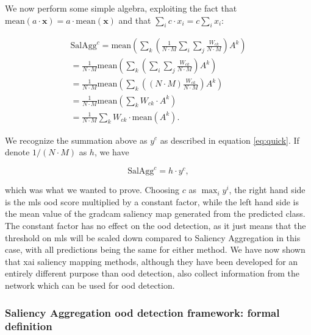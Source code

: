 \documentclass[UKenglish]{uiomasterthesis} %
\theoremstyle{definition}
\begin{document}
We now perform some simple algebra, exploiting the fact that $\text{mean}(a \cdot \bm{x}) = a \cdot \text{mean}(\bm{x})$ and that $\sum_i c \cdot x_i = c \sum_i x_i$:

\begin{gather}
    \text{SalAgg}^c = \text{mean} \left(\sum_k \left( \frac{1}{N \cdot M} \sum_i \sum_j \frac{W_{ck}}{N \cdot M} \right) A^k \right) \\
    = \frac{1}{N \cdot M} \text{mean} \left(\sum_k \left(  \sum_i \sum_j \frac{W_{ck}}{N \cdot M}  \right) A^k \right) \\
    = \frac{1}{N \cdot M} \text{mean} \left(\sum_k \left( (N \cdot M) \frac{W_{ck}}{N \cdot M} \right) A^k \right) \\
    = \frac{1}{N \cdot M} \text{mean} \left(\sum_k  W_{ck} \cdot A^k \right) \\
    = \frac{1}{N \cdot M} \sum_k  W_{ck} \cdot \text{mean}(A^k).
\end{gather}


We recognize the summation above as $y^c$ as described in equation \ref{eq:quick}. If denote $1 / (N \cdot M)$ as $h$, we have

\begin{equation}
    \text{SalAgg}^c = h \cdot y^c,
\end{equation}

which was what we wanted to prove. Choosing $c$ as $\max_i y^i$, the right hand side is the \ac{mls} \ac{ood} score multiplied by a constant factor, while the left hand side is the mean value of the \ac{gradcam} saliency map generated from the predicted class. The constant factor has no effect on the \ac{ood} detection, as it just means that the threshold on \ac{mls} will be scaled down compared to Saliency Aggregation in this case, with all predictions being the same for either method. We have now shown that \ac{xai} saliency mapping methods, although they have been developed for an entirely different purpose than \ac{ood} detection, also collect information from the network which can be used for \ac{ood} detection.

\subsubsection{Saliency Aggregation \ac{ood} detection framework: formal definition}
\end{document}
